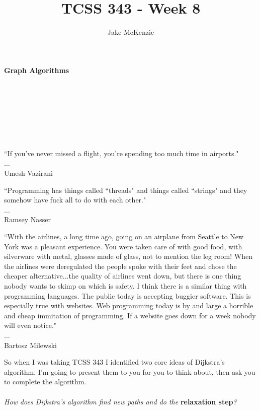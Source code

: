 \documentclass[12pt]{article}
\begin{document}
\title{TCSS 343 - Week 8}
\author{Jake McKenzie}
\maketitle
\noindent\centerline{\textbf{Graph Algorithms}}\\\\\\\\\\\\
\begin{center}
    ``If you’ve never missed a flight, you’re spending too much time in airports." \\$\dots$\\ Umesh Vazirani
\end{center}
\begin{center}
    ``Programming has things called ``threads" and things called ``strings" and they somehow have fuck all to do with each other." \\$\dots$\\ Ramsey Nasser
\end{center}
\begin{center}
    ``With the airlines, a long time ago, going on an airplane from Seattle to New York was a pleasant experience. 
    You were taken care of with good food, with silverware with metal, glasses made of glass, not to mention the leg room!
    When the airlines were deregulated the people spoke with their feet and chose the cheaper alternative...the quality of airlines went down, 
    but there is one thing nobody wants to skimp on which is safety. 
    I think there is a similar thing with programming languages. The public today is accepting buggier software.
    This is especially true with websites. Web programming today is by and large a horrible and cheap immitation of programming.
    If a website goes down for a week nobody will even notice." \\$\dots$\\ Bartosz Milewski
\end{center}
\newpage
\noindent So when I was taking TCSS 343 I identified two core ideas of Dijkstra's algorithm. 
I'm going to present them to you for you to think about, then ask you to complete the algorithm.\\\\
\textit{How does Dijkstra's algorithm find new paths and do the}\textbf{ relaxation step}\textit{?}\\\\
\end{document}
